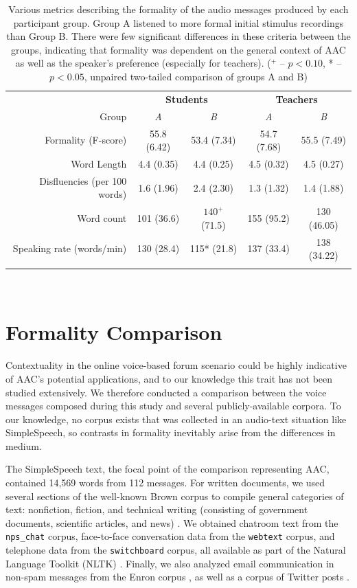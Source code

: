 \begin{table}
	\centering
	\begin{tabular}{r c c c c}
		\toprule
        & \multicolumn{2}{c}{\textbf{Students}} & \multicolumn{2}{c}{\textbf{Teachers}} \\
        Group                        & \textit{A} & \textit{B}  & \textit{A} & \textit{B} \\
        Formality (F-score)          & 55.8 (6.42)   & 53.4 (7.34)         & 54.7 (7.68)   & 55.5 (7.49)\\
        Word Length                  & 4.4 (0.35)   & 4.4 (0.25)           & 4.5 (0.32)    & 4.5 (0.27)\\
        Disfluencies (per 100 words) & 1.6 (1.96)    & 2.4 (2.30)          & 1.3 (1.32)    & 1.4 (1.88)\\
        Word count                   & 101 (36.6)  & $140^+$ (71.5)      & 155 (95.2)  & 130 (46.05)\\
        Speaking rate (words/min)    & 130 (28.4)  & 115* (21.8)      & 137 (33.4)  & 138 (34.22)\\
		\bottomrule \\
	\end{tabular}
	\caption{Various metrics describing the formality of the audio messages produced by each participant group. Group A listened to more formal initial stimulus recordings than Group B. There were few significant differences in these criteria between the groups, indicating that formality was dependent on the general context of AAC as well as the speaker's preference (especially for teachers). ($^+$ -- $p<0.10$, * -- $p<0.05$, unpaired two-tailed comparison of groups A and B)}~\label{tab:formality}
\end{table}

\section{Formality Comparison}
Contextuality in the online voice-based forum scenario could be highly indicative of AAC's potential applications, and to our knowledge this trait has not been studied extensively.
We therefore conducted a comparison between the voice messages composed during this study and several publicly-available corpora.
To our knowledge, no corpus exists that was collected in an audio-text situation like SimpleSpeech, so contrasts in formality inevitably arise from the differences in medium. 

The SimpleSpeech text, the focal point of the comparison representing AAC, contained 14,569 words from 112 messages.
For written documents, we used several sections of the well-known Brown corpus to compile general categories of text: nonfiction, fiction, and technical writing (consisting of government documents, scientific articles, and news) \cite{brown}.
We obtained chatroom text from the \texttt{nps\_chat} corpus, face-to-face conversation data from the \texttt{webtext} corpus, and telephone data from the \texttt{switchboard} corpus, all available as part of the Natural Language Toolkit (NLTK) \cite{nltk}.
Finally, we also analyzed email communication in non-spam messages from the Enron corpus \cite{enronsent}, as well as a corpus of Twitter posts \cite{twitter}.

